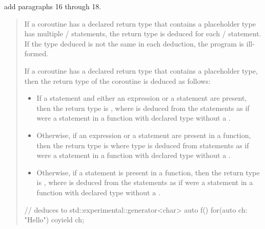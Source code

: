 
add paragraphs 16 through 18.

\begin{quote}
\setcounter{Paras}{15}


\pnum
If a coroutine has a declared return type that contains a placeholder type has multiple / statements, the return type is deduced for each
/ statement. If the type deduced is not the same in each
deduction, the program is ill-formed.

\pnum
If a coroutine has a declared return type that contains a placeholder type, then the return type of the coroutine is deduced as follows:

\begin{itemize}
\item If a  statement and either an  expression or a  statement are present, then
the return type is , where  is deduced from the  statements as if  were a  statement in a function with declared type  without a .


\item Otherwise, if an  expression or a  statement are present in a function, then
the return type is  where type  is deduced from 
 statements as if  were a  statement in a function with declared type  without a .


\item Otherwise, if a  statement is present in a function, then the return type is \linebreak
{},
where  is deduced from the  statements  as if  were a  statement in a function with declared type  without a .

\end{itemize}
\enterexample
\begin{codeblock}
// deduces to std::experimental::generator<char>
auto f() { for(auto ch: "Hello") coyield ch; }


\end{codeblock}
\end{quote}
